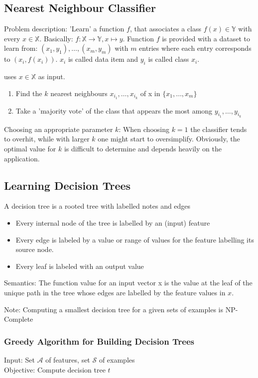 \subsection{Nearest Neighbour Classifier}
Problem description: 'Learn' a function $f$, that associates a class $f(x) \in \mathbb{Y}$ with every $x \in \mathbb{X}$. Basically: $f: \mathbb{X} \rightarrow \mathbb{Y},x \mapsto y$. Function $f$ is provided with a dataset to learn from: $(x_1,y_1), \ldots, (x_m,y_m)$ with $m$ entries where each entry corresponds to $(x_i,f(x_i))$. $x_i$ is called data item and $y_i$ is called class $x_i$.

 uses $x \in \mathbb{X}$ as input.
\begin{enumerate}
	\item Find the $k$ nearest neighbours $x_{i_1},\ldots,x_{i_k}$ of x in $\{x_1,\ldots,x_m\}$
	\item Take a 'majority vote' of the class that appears the most among $y_{i_1},\ldots,y_{i_k}$
\end{enumerate}

Choosing an appropriate parameter $k$: When choosing $k=1$ the classifier tends to overhit, while with larger $k$ one might start to oversimplify. Obviously, the optimal value for $k$ is difficult to determine and depends heavily on the application.

\subsection{Learning Decision Trees}
A decision tree is a rooted tree with labelled notes and edges
\begin{itemize}
	\item Every internal node of the tree is labelled by an (input) feature
	\item Every edge is labeled by a value or range of values for the feature labelling its source node.
	\item Every leaf is labeled with an output value
\end{itemize}
Semantics: The function value for an input vector x is the value at the leaf of the unique path in the tree whose edges are labelled by the feature values in $x$.

Note: Computing a smallest decision tree for a given sets of examples is NP-Complete
\subsubsection{Greedy Algorithm for Building Decision Trees}
Input: Set $\mathcal{A}$ of features, set $\mathcal{S}$ of examples\\
Objective: Compute decision tree $t$

